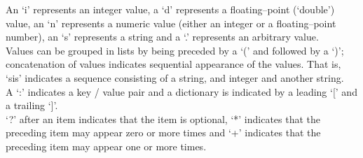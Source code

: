 An `i' represents an integer value, a `d' represents a floating--point (`double') value,
an `n' represents a numeric value (either an integer or a floating--point number), an `s'
represents a string and a `.' represents an arbitrary value.\\

Values can be grouped in lists by being preceded by a `(' and followed by a `)';
concatenation of values indicates sequential appearance of the values.
That is, `sis' indicates a sequence consisting of a string, and integer and another
string.\\

A `:' indicates a key / value pair and a dictionary is indicated by a leading `[' and a
trailing `]'.\\

`?' after an item indicates that the item is optional, `*' indicates that the preceding
item may appear zero or more times and `+' indicates that the preceding item may appear
one or more times.\\

